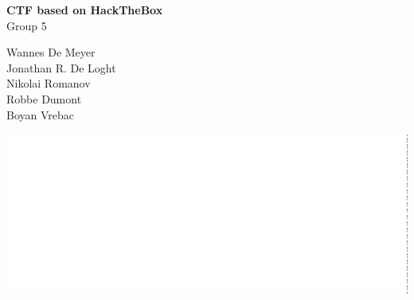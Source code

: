 \documentclass[12pt]{article}
\begin{document}
\begin{titlepage}
  \begin{center}
    \vspace*{5cm}
    \textbf{\Huge{CTF based on HackTheBox}}
    \\
    \Large{Group 5}
    
    \hfill
    
    \large{Wannes De Meyer}\\
    \large{Jonathan R. De Loght}\\
    \large{Nikolai Romanov}\\
    \large{Robbe Dumont}\\
    \large{Boyan Vrebac}
    
    \vfill
    
    \includegraphics[width=0.5\linewidth]{kdglogo}
  \end{center}
\end{titlepage}

\tableofcontents
\newpage
{}



\newpage

\newpage

\newpage

\newpage

\newpage
\end{document}
